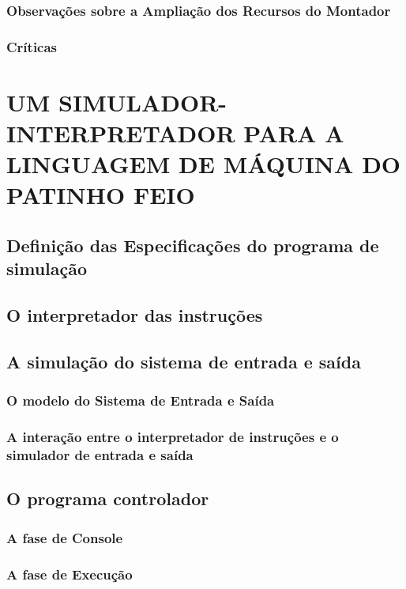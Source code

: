 \documentclass[a4paper,12pt]{article}
\begin{document}
\subsubsection{Observações sobre a Ampliação dos Recursos do Montador}

\subsubsection{Críticas}

\section{UM SIMULADOR-INTERPRETADOR PARA A LINGUAGEM DE MÁQUINA DO PATINHO FEIO}
\subsection{Definição das Especificações do programa de simulação}

\subsection{O interpretador das instruções}

\subsection{A simulação do sistema de entrada e saída}
\subsubsection{O modelo do Sistema de Entrada e Saída}
\subsubsection{A interação entre o interpretador de instruções e o simulador de entrada e saída}

\subsection{O programa controlador}
\subsubsection{A fase de Console}
\subsubsection{A fase de Execução}
\end{document}
